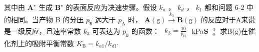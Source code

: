其中由 $\mathbf { A } ^ { \star }$ ⽣成 $\mathbf { B } ^ { \star }$ 的表⾯反应为决速步骤。假设 $k _ { a }$ ， $k _ { d }$ ， $k _ { 1 }$ 都和问题 6-2 中的相同。当产物 B 的分压 $p _ { \mathtt { B } }$ 远⼤于 $p _ { \mathrm { A } }$ 时， $\mathbf { A } ( \mathrm { g } ) \xrightarrow { k _ { 3 } } \mathbf { B } ( \mathrm { g } )$ 的反应对于A来说是⼀级反应，且速率常数 $k _ { 3 }$ 可表达为 $p _ { \mathtt { B } }$ 的函数： $\begin{array} { r } { k _ { 3 } = \frac { 1 0 } { p _ { \mathrm { B } } } } \end{array}$ kPa$\mathbf { S } _ { \mathrm { ~ \scriptsize ~ o ~ } } ^ { - 1 }$ 求B(g)在催化剂上的吸附平衡常数 $K _ { \mathrm { B } } = k _ { a 1 } / k _ { d 1 ^ { \circ } }$
